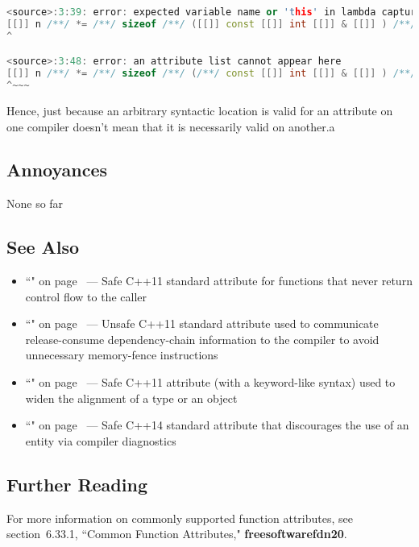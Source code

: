 \begin{lstlisting}[language=C++]
<source>:3:39: error: expected variable name or 'this' in lambda capture list
[[]] n /**/ *= /**/ sizeof /**/ ([[]] const [[]] int [[]] & [[]] ) /**/;
^

<source>:3:48: error: an attribute list cannot appear here
[[]] n /**/ *= /**/ sizeof /**/ (/**/ const [[]] int [[]] & [[]] ) /**/;
^~~~
\end{lstlisting}

\noindent Hence, just because an arbitrary syntactic location is valid for an
attribute on one compiler doesn't mean that it is necessarily valid on
another.a

\subsection[Annoyances]{Annoyances}\label{annoyances}

None so far

\subsection[See Also]{See Also}\label{see-also}

\begin{itemize}
\item{``" on page~\pageref{the-noreturn-attribute} — Safe C++11 standard attribute for functions that never return control flow to the caller}
\item{``" on page~\pageref{carriesdependency} — Unsafe C++11 standard attribute used to communicate release-consume dependency-chain information to the compiler to avoid unnecessary memory-fence instructions}
\item{``" on page~\pageref{alignas} --- Safe C++11 attribute (with a keyword-like syntax) used to widen the alignment of a type or an object}
\item{``" on page~\pageref{deprecated} — Safe C++14 standard attribute that discourages the use of an entity via compiler diagnostics}
\end{itemize}

\subsection[Further Reading]{Further Reading}\label{attribute-further-reading}

For more information on commonly supported function attributes, see
section~6.33.1, ``Common Function Attributes," \textbf{{freesoftwarefdn20}}.


